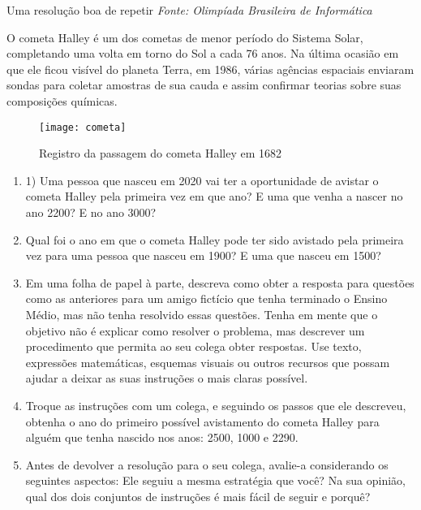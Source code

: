 \begin{task}{Uma resolução boa de repetir}
\label{comp-task2}
\textit{Fonte: Olimpíada Brasileira de Informática}

O cometa Halley é um dos cometas de menor período do Sistema Solar, completando uma volta em torno do Sol a cada 76 anos. Na última ocasião em que ele ficou visível do planeta Terra, em 1986, várias agências espaciais enviaram sondas para coletar amostras de sua cauda e assim confirmar teorias sobre suas composições químicas.

\begin{figure}[H]
\centering

\texttt{[image: cometa]}
\caption{Registro da passagem do cometa Halley em 1682}
\end{figure}

\begin{enumerate}
\item 1) Uma pessoa que nasceu em 2020 vai ter a oportunidade de avistar o cometa Halley pela primeira vez em que ano? E uma que venha a nascer no ano 2200? E no ano 3000?

\item Qual foi o ano em que o cometa Halley pode ter sido avistado pela primeira vez para uma pessoa que nasceu em 1900? E uma que nasceu em 1500?

\item Em uma folha de papel à parte, descreva como obter a resposta para questões como as anteriores para um amigo fictício que tenha terminado o Ensino Médio, mas não tenha resolvido essas questões. Tenha em mente que o objetivo não é explicar como resolver o problema, mas descrever um procedimento que permita ao seu colega obter respostas. Use texto, expressões matemáticas, esquemas visuais ou outros recursos que possam ajudar a deixar as suas instruções o mais claras possível.

\item Troque as instruções com um colega, e seguindo os passos que ele descreveu, obtenha o ano do primeiro possível avistamento do cometa Halley para alguém que tenha nascido nos anos: 2500, 1000 e 2290.

\item Antes de devolver a resolução para o seu colega, avalie-a considerando os seguintes aspectos: Ele seguiu a mesma estratégia que você? Na sua opinião, qual dos dois conjuntos de instruções é mais fácil de seguir e porquê?
\end{enumerate}

\end{task}




